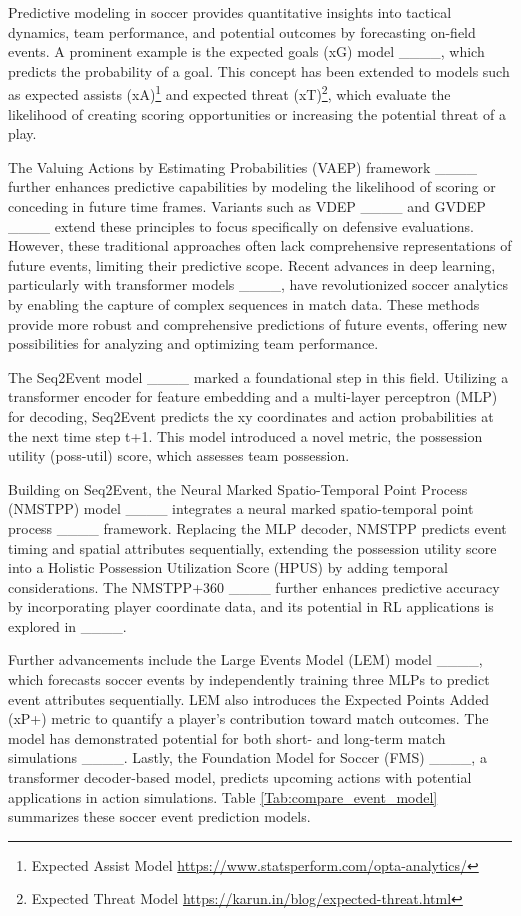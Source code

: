 Predictive modeling in soccer provides quantitative insights into tactical dynamics, team performance, and potential outcomes by forecasting on-field events. A prominent example is the expected goals (xG) model ____, which predicts the probability of a goal. This concept has been extended to models such as expected assists (xA)\footnote{Expected Assist Model \url{https://www.statsperform.com/opta-analytics/}} and expected threat (xT)\footnote{Expected Threat Model \url{https://karun.in/blog/expected-threat.html}}, which evaluate the likelihood of creating scoring opportunities or increasing the potential threat of a play.

The Valuing Actions by Estimating Probabilities (VAEP) framework ____ further enhances predictive capabilities by modeling the likelihood of scoring or conceding in future time frames. Variants such as VDEP ____ and GVDEP ____ extend these principles to focus specifically on defensive evaluations. However, these traditional approaches often lack comprehensive representations of future events, limiting their predictive scope. Recent advances in deep learning, particularly with transformer models ____, have revolutionized soccer analytics by enabling the capture of complex sequences in match data. These methods provide more robust and comprehensive predictions of future events, offering new possibilities for analyzing and optimizing team performance.

The Seq2Event model ____ marked a foundational step in this field. Utilizing a transformer encoder for feature embedding and a multi-layer perceptron (MLP) for decoding, Seq2Event predicts the xy coordinates and action probabilities at the next time step t+1. This model introduced a novel metric, the possession utility (poss-util) score, which assesses team possession.

Building on Seq2Event, the Neural Marked Spatio-Temporal Point Process (NMSTPP) model ____ integrates a neural marked spatio-temporal point process ____ framework. Replacing the MLP decoder, NMSTPP predicts event timing and spatial attributes sequentially, extending the possession utility score into a Holistic Possession Utilization Score (HPUS) by adding temporal considerations. The NMSTPP+360 ____ further enhances predictive accuracy by incorporating player coordinate data, and its potential in RL applications is explored in ____.

Further advancements include the  Large Events Model (LEM) model ____, which forecasts soccer events by independently training three MLPs to predict event attributes sequentially. LEM also introduces the Expected Points Added (xP+) metric to quantify a player’s contribution toward match outcomes. The model has demonstrated potential for both short- and long-term match simulations ____. Lastly, the Foundation Model for Soccer (FMS) ____, a transformer decoder-based model, predicts upcoming actions with potential applications in action simulations. Table \ref{Tab:compare_event_model} summarizes these soccer event prediction models.

